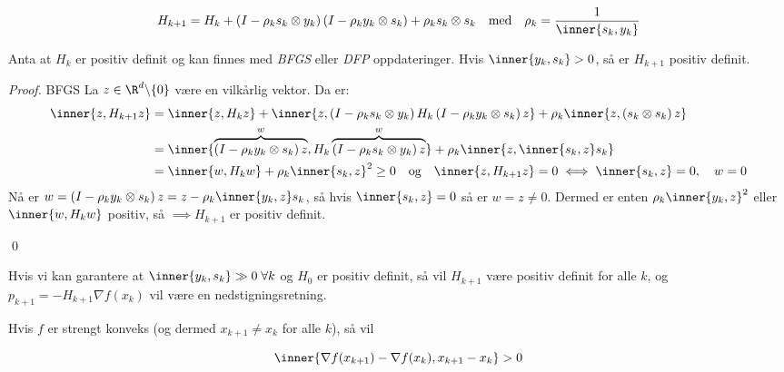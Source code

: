 \[
	H_{k+1} = H_k + \left(I - \rho_k s_k \otimes y_k\right) \left(I - \rho_k y_k \otimes s_k\right) + \rho_k s_k \otimes s_k \quad \text{med} \quad \rho_k = \frac{1}{\inner{s_k, y_k}}
\]

\begin{lemma}{}{}
	Anta at \( H_k \) er positiv definit og kan finnes med \textit{BFGS} eller \textit{DFP} oppdateringer.
	Hvis \( \inner{y_k, s_k} > 0 \), så er \( H_{k+1} \) positiv definit.
\end{lemma}

\begin{proof}{BFGS}{}
	La \( z \in \R^d \backslash \{0\} \) være en vilkårlig vektor.
	Da er:
	\begin{align*}
		\inner{z, H_{k+1} z} & = \inner{z, H_k z} + \inner{z, \left(I - \rho_k s_k \otimes y_k\right)H_k \left(I - \rho_k y_k \otimes s_k\right) z} + \rho_k \inner{z, \left(s_k \otimes s_k\right) z}   \\
		                     & = \inner{\overbrace{\left(I - \rho_k y_k \otimes s_k\right) z}^{w}, H_k \overbrace{\left(I - \rho_k s_k \otimes y_k\right) z}^{w}} + \rho_k \inner{z, \inner{s_k, z} s_k} \\
		                     & = \inner{w, H_k w} + \rho_k \inner{s_k, z}^2 \geq 0 \quad \text{og} \quad \inner{z, H_{k+1} z} = 0 \iff \inner{s_k, z} = 0, \quad w = 0
	\end{align*}
	Nå er \( w = \left(I - \rho_k y_k \otimes s_k\right) z = z - \rho_k \inner{y_k, z} s_k \), så hvis \( \inner{s_k, z} = 0 \) så er \( w = z \neq 0 \).
	Dermed er enten \( \rho_k\inner{y_k, z}^2\) eller \( \inner{w, H_k w} \) positiv, så \(\implies H_{k+1} \) er positiv definit.

	\qed
\end{proof}


Hvis vi kan garantere at \( \inner{y_k, s_k} \gg 0 \; \forall k \) og \( H_0 \) er positiv definit, så vil \( H_{k+1} \) være positiv definit for alle \( k \), og \(p_{k+1} = -H_{k+1} \nabla f(x_k) \) vil være en nedstigningsretning.

Hvis \( f \) er strengt konveks (og dermed \(x_{k+1} \neq x_k \) for alle \( k \)), så vil

\[
	\inner{\nabla f(x_{k+1}) - \nabla f(x_k), x_{k+1} - x_k} > 0
\]

